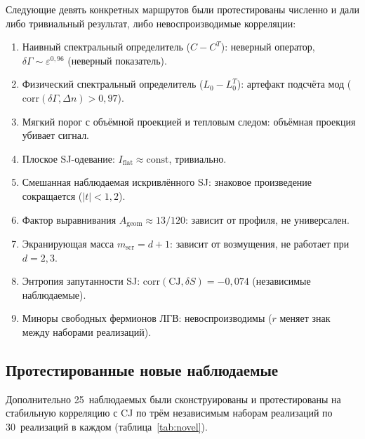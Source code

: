 \documentclass[12pt,a4paper]{article}
\theoremstyle{plain}
\theoremstyle{definition}
\theoremstyle{remark}
\newcommand{\CJ}{\mathrm{CJ}}
\begin{document}
Следующие девять конкретных маршрутов были протестированы
численно и дали либо тривиальный результат, либо
невоспроизводимые корреляции:
\begin{enumerate}
\item Наивный спектральный определитель ($C - C^T$):
  неверный оператор,
  $\delta\Gamma \sim \varepsilon^{0{,}96}$ (неверный показатель).
\item Физический спектральный определитель ($L_0 - L_0^T$):
  артефакт подсчёта мод
  ($\text{corr}(\delta\Gamma, \Delta n) > 0{,}97$).
\item Мягкий порог с объёмной проекцией и тепловым следом:
  объёмная проекция убивает сигнал.
\item Плоское SJ-одевание: $I_{\mathrm{flat}} \approx \text{const}$,
  тривиально.
\item Смешанная наблюдаемая искривлённого SJ: знаковое
  произведение сокращается ($|t| < 1{,}2$).
\item Фактор выравнивания
  $A_{\mathrm{geom}} \approx 13/120$: зависит от профиля,
  не универсален.
\item Экранирующая масса $m_{\mathrm{scr}} = d+1$:
  зависит от возмущения, не работает при $d = 2, 3$.
\item Энтропия запутанности SJ:
  $\text{corr}(\CJ, \delta S) = -0{,}074$
  (независимые наблюдаемые).
\item Миноры свободных фермионов ЛГВ: невоспроизводимы
  ($r$ меняет знак между наборами реализаций).
\end{enumerate}

\subsection{Протестированные новые наблюдаемые}
\label{sec:novel-obs}

Дополнительно 25~наблюдаемых были сконструированы и
протестированы на стабильную корреляцию с CJ по трём
независимым наборам реализаций по 30~реализаций в каждом
(таблица~\ref{tab:novel}).
\end{document}

